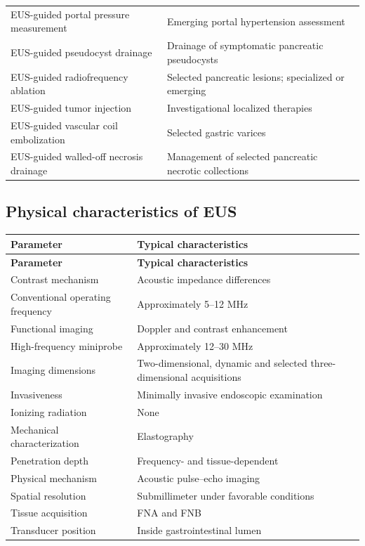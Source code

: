\begin{longtable}{@{}p{}p{}@{}}
EUS-guided portal pressure measurement & Emerging portal hypertension assessment \\
EUS-guided pseudocyst drainage & Drainage of symptomatic pancreatic pseudocysts \\
EUS-guided radiofrequency ablation & Selected pancreatic lesions; specialized or emerging \\
EUS-guided tumor injection & Investigational localized therapies \\
EUS-guided vascular coil embolization & Selected gastric varices \\
EUS-guided walled-off necrosis drainage & Management of selected pancreatic necrotic collections \\
\bottomrule
\end{longtable}

\subsection{Physical characteristics of EUS}
\begin{longtable}{@{}p{}p{}@{}}
\toprule
\textbf{Parameter} & \textbf{Typical characteristics} \\
\midrule
\endfirsthead
\toprule
\textbf{Parameter} & \textbf{Typical characteristics} \\
\midrule
\endhead
Contrast mechanism & Acoustic impedance differences \\
Conventional operating frequency & Approximately 5--12 MHz \\
Functional imaging & Doppler and contrast enhancement \\
High-frequency miniprobe & Approximately 12--30 MHz \\
Imaging dimensions & Two-dimensional, dynamic and selected three-dimensional acquisitions \\
Invasiveness & Minimally invasive endoscopic examination \\
Ionizing radiation & None \\
Mechanical characterization & Elastography \\
Penetration depth & Frequency- and tissue-dependent \\
Physical mechanism & Acoustic pulse--echo imaging \\
Spatial resolution & Submillimeter under favorable conditions \\
Tissue acquisition & FNA and FNB \\
Transducer position & Inside gastrointestinal lumen \\
\bottomrule
\end{longtable}

